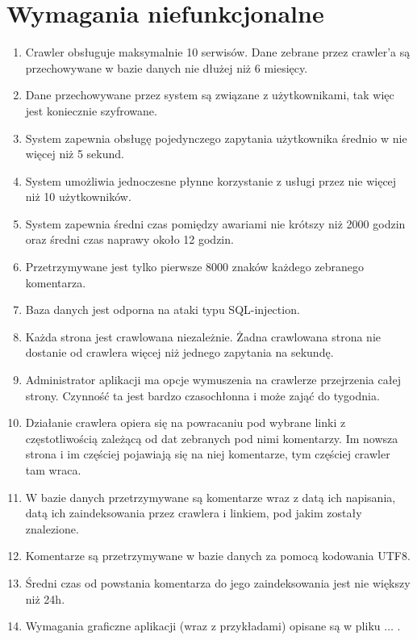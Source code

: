 \documentclass[a4paper]{scrreprt}
\begin{document}
\section*{Wymagania niefunkcjonalne}
\begin{enumerate}
	\itemsep-0.1cm
	\item Crawler  obsługuje maksymalnie 10 serwisów. Dane zebrane przez crawler'a są przechowywane w bazie danych nie dłużej niż 6 miesięcy.

	\item Dane przechowywane przez system  są związane z użytkownikami, tak więc jest koniecznie szyfrowane.

	\item System zapewnia obsługę pojedynczego zapytania użytkownika średnio w nie więcej niż 5 sekund.

	\item System  umożliwia jednoczesne płynne korzystanie z usługi przez nie więcej niż 10 użytkowników.

	\item System zapewnia średni czas pomiędzy awariami nie krótszy niż 2000 godzin oraz średni czas naprawy około 12 godzin.
	
	\item Przetrzymywane jest tylko pierwsze 8000 znaków każdego zebranego komentarza.
	
	\item Baza danych jest odporna na ataki typu SQL-injection.
	
	\item Każda strona jest crawlowana niezależnie. Żadna crawlowana strona nie dostanie od crawlera więcej niż jednego zapytania na sekundę.
	
	\item Administrator aplikacji ma opcje wymuszenia na crawlerze przejrzenia całej strony. Czynność ta jest bardzo czasochłonna i może zająć do tygodnia.
	
	\item Działanie crawlera opiera się na powracaniu pod wybrane linki z częstotliwością zależącą od dat zebranych pod nimi komentarzy. Im nowsza strona i im częściej pojawiają się na niej komentarze, tym częściej crawler tam wraca.
	
	\item W bazie danych przetrzymywane są komentarze wraz z datą ich napisania, datą ich zaindeksowania przez crawlera i linkiem, pod jakim zostały znalezione.
	
	\item Komentarze są przetrzymywane w bazie danych za pomocą kodowania UTF8.
	
	\item Średni czas od powstania komentarza do jego zaindeksowania jest nie większy niż 24h.
	
	\item Wymagania graficzne aplikacji (wraz z przykładami) opisane są w pliku {$\ldots$} .
	

\end{enumerate}
\end{document}
